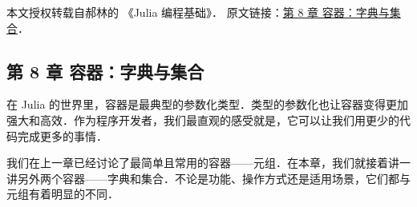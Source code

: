 
本文授权转载自郝林的 《Julia 编程基础》． 原文链接：\href{https://github.com/hyper0x/JuliaBasics/blob/master/book/ch08.md}{第 8 章 容器：字典与集合}．


\subsection{第 8 章 容器：字典与集合}

在 Julia 的世界里，容器是最典型的参数化类型．类型的参数化也让容器变得更加强大和高效．作为程序开发者，我们最直观的感受就是，它可以让我们用更少的代码完成更多的事情．

我们在上一章已经讨论了最简单且常用的容器——元组．在本章，我们就接着讲一讲另外两个容器——字典和集合．不论是功能、操作方式还是适用场景，它们都与元组有着明显的不同．